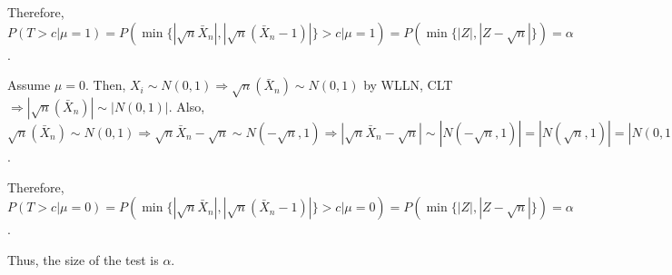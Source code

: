 \documentclass[11pt]{article} %
\begin{document}
Therefore, $P(T>c|\mu =1) = P(\min \{|\sqrt{n}\bar{X}_n|,|\sqrt{n}(\bar{X}_n - 1)| \}>c|\mu = 1) = P(\min \{ |Z|,|Z - \sqrt{n}|\}) = \alpha$.

Assume $\mu = 0.$ Then, $X_i \sim N(0,1) \Rightarrow \sqrt{n}(\bar{X}_n ) \sim N(0,1)$ by WLLN, CLT $\Rightarrow |\sqrt{n}(\bar{X}_n )| \sim |N(0,1)|.$ Also, $\sqrt{n}(\bar{X}_n ) \sim N(0,1) \Rightarrow \sqrt{n}\bar{X}_n -\sqrt{n} \sim N(-\sqrt{n},1) \Rightarrow |\sqrt{n}\bar{X}_n -\sqrt{n}| \sim |N(-\sqrt{n},1)| = |N(\sqrt{n},1)| = |N(0,1) + \sqrt{n}|$.

Therefore, $P(T>c|\mu =0) = P(\min \{|\sqrt{n}\bar{X}_n|,|\sqrt{n}(\bar{X}_n - 1)| \}>c|\mu = 0) = P(\min \{ |Z|,|Z - \sqrt{n}|\}) = \alpha$.

Thus, the size of the test is $\alpha$.
\end{document}
